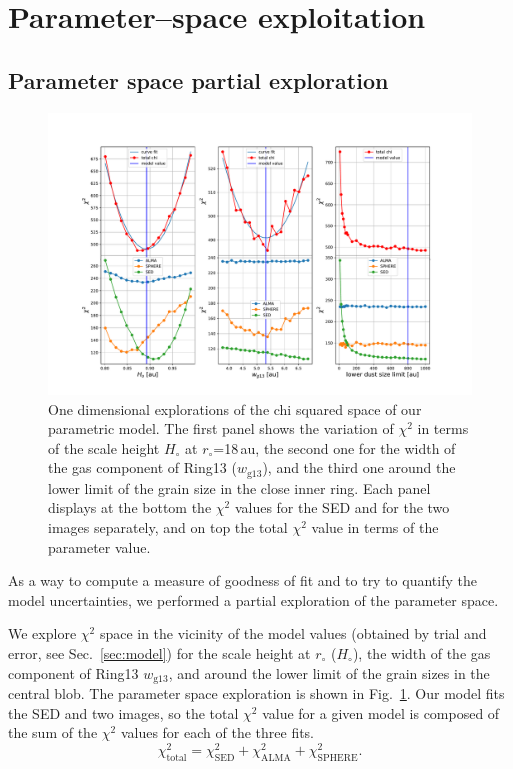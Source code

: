 \documentclass[fleqn,usenatbib,useAMS]{mnras}
\begin{document}

\appendix

\section{Parameter--space exploitation} \label{sec:Appendix}

\subsection{Parameter space partial exploration} \label{sec:A1}

\begin{figure}
	\includegraphics[width=\textwidth]{plot_chi_squared_all.pdf}
        \caption{One dimensional explorations of the chi squared space of our parametric model. The first panel shows the variation of $\chi^2$ in terms of the scale height $H_\circ$ at $r_\circ$=18\,au, the second one for the width of the gas component of Ring13 ($w_{\mathrm{g13}}$), and the third one around the lower limit of the grain size in the close inner ring. Each panel displays at the bottom the $\chi^2$ values for the SED and for the two images separately, and on top the total $\chi^2$ value in terms of the parameter value.}
    \label{fig:chi}
\end{figure}

As a way to compute a measure of goodness of fit and to try to quantify the model uncertainties, we performed a partial exploration of the parameter space. 

We explore $\chi^2$ space in the vicinity of the model values (obtained by trial and error, see Sec.~\ref{sec:model}) for the scale height at $r_\circ$ ($H_\circ$), the width of the gas component of Ring13 $w_{\mathrm{g13}}$, and around the lower limit of the grain sizes in the central blob. The parameter space exploration is shown in Fig.~\ref{fig:chi}. Our model fits the SED and two images, so the total $\chi^2$ value for a given model is composed of the sum of the $\chi^2$ values for each of the three fits.
\begin{equation}
    \chi^2_{\mathrm{total}}=\chi^2_{\mathrm{SED}}+\chi^2_{\mathrm{ALMA}}+\chi^2_{\mathrm{SPHERE}}.
\end{equation}
\end{document}
